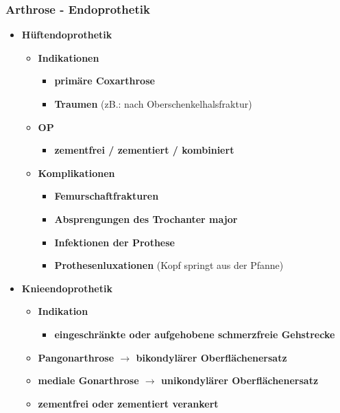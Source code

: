 	\subsubsection{Arthrose - Endoprothetik}
		\begin{itemize}
			\item \textbf{Hüftendoprothetik}
				\begin{itemize}
					\item \textbf{Indikationen}
						\begin{itemize}
							\item \textbf{primäre Coxarthrose}
							\item \textbf{Traumen} (zB.: nach Oberschenkelhalsfraktur)
						\end{itemize}
					\item \textbf{OP}
						\begin{itemize}
							\item \textbf{zementfrei / zementiert / kombiniert}
						\end{itemize}
					\item \textbf{Komplikationen}
						\begin{itemize}
							\item \textbf{Femurschaftfrakturen}
							\item \textbf{Absprengungen des Trochanter major}
							\item \textbf{Infektionen der Prothese}
							\item \textbf{Prothesenluxationen} (Kopf springt aus der Pfanne)
						\end{itemize}
				\end{itemize}
			\item \textbf{Knieendoprothetik}
				\begin{itemize}
					\item \textbf{Indikation}
						\begin{itemize}
							\item \textbf{eingeschränkte oder aufgehobene schmerzfreie Gehstrecke}
						\end{itemize}
					\item \textbf{Pangonarthrose $\rightarrow$ bikondylärer Oberflächenersatz}
					\item \textbf{mediale Gonarthrose $\rightarrow$ unikondylärer Oberflächenersatz}
					\item \textbf{zementfrei oder zementiert verankert}
				\end{itemize}
	 	\end{itemize}
		

